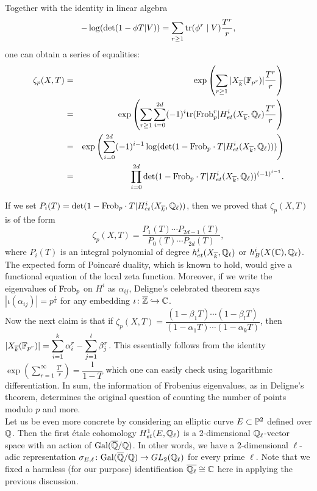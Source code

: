 Together with the identity in linear algebra \[-\log(\det(1 - \phi T | V ) ) = \displaystyle\sum_{r \geq 1} \mr{tr} ( \phi^r \mid V ) \frac{T^r}{r},\]
one can obtain a series of equalities:
\begin{eqnarray*}
\zeta_p(X,T)  &=& \mr{exp}\left( \displaystyle\sum_{r \geq 1} |X_{\overline{k}}(\fF_{p^r})| \frac{T^r}{r} \right)\\
 &=& \mr{exp}\left(\displaystyle\sum_{r \geq 1} \displaystyle\sum_{i = 0 }^{2d }  (-1)^i \mr{tr}(\mr{Frob}_p^r|H^i_{et}(X_{\overline{k} } , \qQ_\ell )  \frac{T^r}{r}  \right)\\
 &=& \mr{exp}\left(\displaystyle\sum_{i = 0 }^{2d }  (-1)^{i-1} \log (\det ( 1- \mr{Frob}_p \cdot T |H^i_{et}(X_{\overline{k} } , \qQ_\ell )  ) )  \right)\\
 &=& \displaystyle\prod_{i=0}^{2d } \mr{det}(1-\mr{Frob}_p \cdot T| H^i_{et}(X_{\overline{k} } , \qQ_\ell ) )^{(-1)^{i-1} }.
\end{eqnarray*}

If we set $P_i(T)= \mr{det}(1-\mr{Frob}_p \cdot T| H^i_{et}(X_{\overline{k} } , \qQ_\ell ) )$, then we proved that $\zeta_p(X,T)$ is of the form \[\zeta_p(X,T) = \dfrac{ P_1(T)\cdots P_{2d-1}(T) }{P_0(T)\cdots P_{2d}(T) },
\]
where $P_i(T)$ is an integral polynomial of degree $h^i_{et}(X_{\overline{k} } , \qQ_\ell )$ or $h^i_B(X(\cC), \qQ_\ell )$. The expected form of Poincar\'e duality, which is known to hold, would give a functional equation of the local zeta function. Moreover, if we write the eigenvalues of $\mr{Frob}_p$ on $H^i$ as $\alpha_{ij}$, Deligne's celebrated theorem says $|\iota(\alpha_{ij})| = p^{\frac{i}{2}}$ for any embedding $\iota \colon \overline{\zZ} \hookrightarrow \cC$.\\

Now the next claim is that if $\zeta_{p}(X,T) = \dfrac{(1-\beta_1 T) \cdots (1-\beta_lT) }{(1-\alpha_1T) \cdots (1- \alpha_k T ) }$, then $|X_{\overline{k}}(\fF_{p^r})|= \displaystyle\sum_{i=1}^k \alpha_i^r - \displaystyle\sum_{j=1}^l \beta_j^r$. This essentially follows from the identity $\exp\left(\displaystyle\sum_{r=1}^\infty \frac{T^r}{r} \right) = \dfrac{1}{1-T}$ which one can easily check using logarithmic differentiation. In sum, the information of Frobenius eigenvalues, as in Deligne's theorem, determines the original question of counting the number of points modulo $p$ and more.\\


Let us be even more concrete by considering an elliptic curve $E \subset \P^2$ defined over $\qQ$. Then the first \'etale cohomology $H^1_{et}(E, \qQ_\ell )$ is a 2-dimensional $\qQ_\ell$-vector space with an action of $\mr{Gal}(\overline{\qQ} / \qQ )$. In other words, we have a 2-dimensional $\ell$-adic representation $\sigma_{E,\ell} \colon \mr{Gal}(\overline{\qQ}/\qQ) \rightarrow GL_2(\qQ_\ell)$ for every prime $\ell$. Note that we fixed a harmless (for our purpose) identification $\overline{\qQ_\ell} \cong \cC$ here in applying the previous discussion.\\

